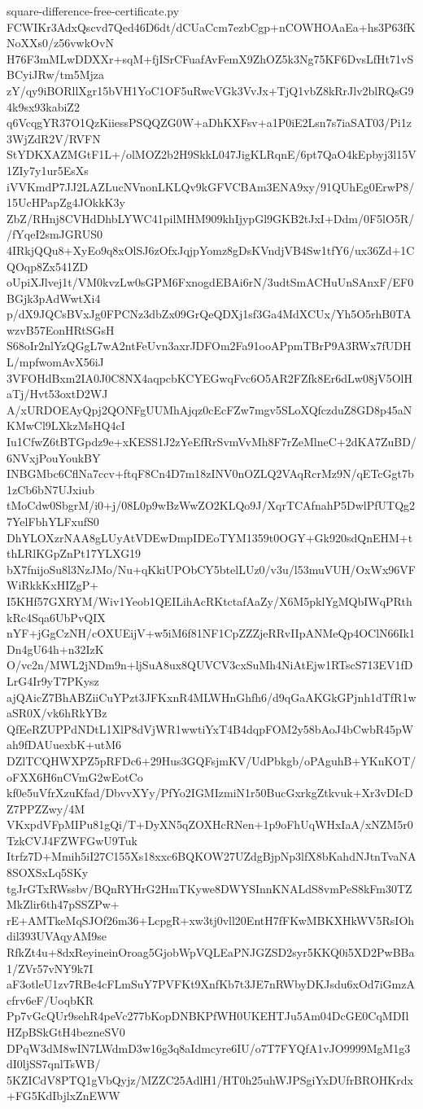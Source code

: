 \documentclass[11pt]{article}
\theoremstyle{definition}
\theoremstyle{remark}
\begin{document}
\begin{filecontents*}[overwrite]{square-difference-free-certificate.py}
FCWIKr3AdxQscvd7Qed46D6dt/dCUaCcm7ezbCgp+nCOWHOAaEa+hs3P63fKNoXXs0/z56vwkOvN
H76F3mMLwDDXXr+sqM+fjISrCFuafAvFemX9ZhOZ5k3Ng75KF6DvsLfHt71vSBCyiJRw/tm5Mjza
zY/qy9iBORllXgr15bVH1YoC1OF5uRwcVGk3VvJx+TjQ1vbZ8kRrJlv2blRQsG94k9sx93kabiZ2
q6VcqgYR37O1QzKiiessPSQQZG0W+aDhKXFsv+a1P0iE2Lsn7s7iaSAT03/Pi1z3WjZdR2V/RVFN
StYDKXAZMGtF1L+/olMOZ2b2H9SkkL047JigKLRqnE/6pt7QaO4kEpbyj3l15V1ZIy7y1ur5EsXs
iVVKmdP7JJ2LAZLucNVnonLKLQv9kGFVCBAm3ENA9xy/91QUhEg0ErwP8/15UcHPapZg4JOkkK3y
ZbZ/RHnj8CVHdDhbLYWC41pilMHM909khIjypGl9GKB2tJxI+Ddm/0F5lO5R//fYqeI2smJGRUS0
4IRkjQQu8+XyEo9q8xOlSJ6zOfxJqjpYomz8gDsKVndjVB4Sw1tfY6/ux36Zd+1CQOqp8Zx541ZD
oUpiXJlvej1t/VM0kvzLw0sGPM6FxnogdEBAi6rN/3udtSmACHuUnSAnxF/EF0BGjk3pAdWwtXi4
p/dX9JQCsBVxJg0FPCNz3dbZx09GrQeQDXj1sf3Ga4MdXCUx/Yh5O5rhB0TAwzvB57EonHRtSGsH
S68oIr2nlYzQGgL7wA2ntFeUvn3axrJDFOm2Fa91ooAPpmTBrP9A3RWx7fUDHL/mpfwomAvX56iJ
3VFOHdBxm2IA0J0C8NX4aqpcbKCYEGwqFvc6O5AR2FZfk8Er6dLw08jV5OlHaTj/Hvt53oxtD2WJ
A/xURDOEAyQpj2QONFgUUMhAjqz0cEcFZw7mgv5SLoXQfczduZ8GD8p45aNKMwCl9LXkzMsHQ4cI
Iu1CfwZ6tBTGpdz9e+xKESS1J2zYeEfRrSvmVvMh8F7rZeMlneC+2dKA7ZuBD/6NVxjPouYoukBY
INBGMbc6CflNa7ccv+ftqF8Cn4D7m18zINV0nOZLQ2VAqRcrMz9N/qETcGgt7b1zCb6bN7UJxiub
tMoCdw0SbgrM/i0+j/08L0p9wBzWwZO2KLQo9J/XqrTCAfnahP5DwlPfUTQg27YelFbhYLFxufS0
DhYLOXzrNAA8gLUyAtVDEwDmpIDEoTYM1359t0OGY+Gk920sdQnEHM+tthLRlKGpZnPt17YLXG19
bX7fnijoSu8l3NzJMo/Nu+qKkiUPObCY5btelLUz0/v3u/l53muVUH/OxWx96VFWiRkkKxHIZgP+
I5KHf57GXRYM/Wiv1Yeob1QEILihAcRKtctafAaZy/X6M5pklYgMQbIWqPRthkRc4Sqa6UbPvQIX
nYF+jGgCzNH/cOXUEijV+w5iM6f81NF1CpZZZjeRRvIIpANMeQp4OClN66Ik1Dn4gU64h+n32IzK
O/vc2n/MWL2jNDm9n+ljSuA8ux8QUVCV3cxSuMh4NiAtEjw1RTscS713EV1fDLrG4Ir9yT7PKysz
ajQAicZ7BhABZiiCuYPzt3JFKxnR4MLWHnGhfh6/d9qGaAKGkGPjnh1dTfR1waSR0X/vk6hRkYBz
QfEeRZUPPdNDtL1XlP8dVjWR1wwtiYxT4B4dqpFOM2y58bAoJ4bCwbR45pWah9fDAUuexbK+utM6
DZlTCQHWXPZ5pRFDc6+29Hus3GQFsjmKV/UdPbkgb/oPAguhB+YKnKOT/oFXX6H6nCVmG2wEotCo
kf0e5uVfrXzuKfad/DbvvXYy/PfYo2IGMIzmiN1r50BucGxrkgZtkvuk+Xr3vDIcDZ7PPZZwy/4M
VKxpdVFpMIPu81gQi/T+DyXN5qZOXHcRNen+1p9oFhUqWHxIaA/xNZM5r0TzkCVJ4FZWFGwU9Tuk
Itrfz7D+Mmih5iI27C155Xs18xxc6BQKOW27UZdgBjpNp3lfX8bKahdNJtnTvaNA8SOXSxLq5SKy
tgJrGTxRWssbv/BQnRYHrG2HmTKywe8DWYSInnKNALdS8vmPeS8kFm30TZMkZlir6th47pSSZPw+
rE+AMTkeMqSJOf26m36+LcpgR+xw3tj0vll20EntH7fFKwMBKXHkWV5RsIOhdil393UVAqyAM9se
RfkZt4u+8dxReyineinOroag5GjobWpVQLEaPNJGZSD2syr5KKQ0i5XD2PwBBa1/ZVr57vNY9k7I
aF3otleU1zv7RBe4cFLmSuY7PVFKt9XnfKb7t3JE7nRWbyDKJsdu6xOd7iGmzAcfrv6eF/UoqbKR
Pp7vGcQUr9sehR4peVc277bKopDNBKPfWH0UKEHTJu5Am04DcGE0CqMDIlHZpBSkGtH4bezneSV0
DPqW3dM8wIN7LWdmD3w16g3q8aIdmcyre6IU/o7T7FYQfA1vJO9999MgM1g3dI0ljSS7qnlTsWB/
5KZICdV8PTQ1gVbQyjz/MZZC25AdlH1/HT0h25uhWJPSgiYxDUfrBROHKrdx+FG5KdIbjlxZnEWW

\end{filecontents*}
\end{document}
